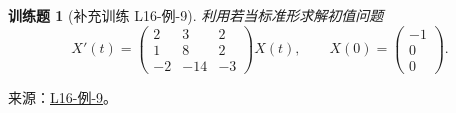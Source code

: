 \documentclass[12pt,fontset=fandol]{ctexart}
\newtheorem{exercise}{训练题}[section]
\begin{document}
\begin{exercise}[补充训练 L16-例-9]\label{prob:L16-例-9}
利用若当标准形求解初值问题
    \[
        X'(t)=\begin{pmatrix}
            2 & 3 & 2 \\ 1 & 8 & 2 \\ -2 & -14 & -3
        \end{pmatrix}X(t),\qquad
        X(0)=\begin{pmatrix}
            -1 \\ 0 \\ 0
        \end{pmatrix}.
    \]
\end{exercise}
\noindent 来源：\href{https://github.com/yhwu-is/Linear-Algebra-Left-Undone/blob/new/%E8%AE%B2%E4%B9%89/%E4%B8%93%E9%A2%98/16%20%E8%8B%A5%E5%BD%93%E6%A0%87%E5%87%86%E5%BD%A2.tex}{L16-例-9}。
\end{document}
